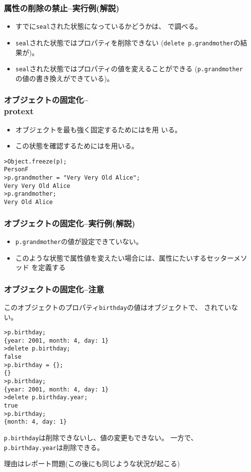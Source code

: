 \begin{frame}[containsverbatim]
 \frametitle{属性の削除の禁止--実行例(解説)}
\begin{itemize}
	 \item すでに\texttt{seal}された状態になっているかどうかは、
				 で調べる。
 \item \texttt{seal}された状態ではプロパティを削除できない
			 (\texttt{delete p.grandmother}の結果が)。
 \item \texttt{seal}された状態ではプロパティの値を変えることができる
			 (\texttt{p.grandmother}の値の書き換えができている)。
\end{itemize}
\end{frame}
\begin{frame}[containsverbatim]
 \frametitle{オブジェクトの固定化--\\protext{}}
\begin{itemize}
 \item オブジェクトを最も強く固定するためにはを用
			 いる。
 \item この状態を確認するためにはを用いる。
\end{itemize}
\begin{Verbatim}
>Object.freeze(p);
PersonF
>p.grandmother = "Very Very Old Alice";
Very Very Old Alice
>p.grandmother;
Very Old Alice
\end{Verbatim}
\end{frame}
\begin{frame}[containsverbatim]
 \frametitle{オブジェクトの固定化--実行例(解説)}
 \begin{itemize}
  \item \texttt{p.grandmother}の値が設定できていない。
  \item このような状態で属性値を変えたい場合には、属性にたいするセッターメソッド
  を定義する
 \end{itemize}
\end{frame}
\begin{frame}[containsverbatim]
 \frametitle{オブジェクトの固定化--注意}
 このオブジェクトのプロパティ\texttt{birthday}の値はオブジェクトで、
 されていない。
 {\scriptsize
\begin{Verbatim}
>p.birthday;
{year: 2001, month: 4, day: 1}
>delete p.birthday;
false
>p.birthday = {};
{}
>p.birthday;
{year: 2001, month: 4, day: 1}
>delete p.birthday.year;
true
>p.birthday;
{month: 4, day: 1}
\end{Verbatim}
 }
 \texttt{p.birthday}は削除できないし、値の変更もできない。
 一方で、\texttt{p.birthday.year}は削除できる。

 理由はレポート問題(この後にも同じような状況が起こる)
\end{frame}
